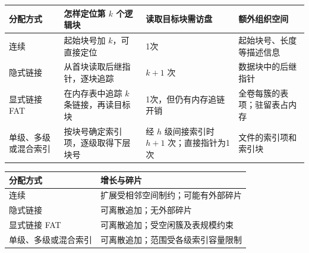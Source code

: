 \begin{wideblock}

\par\medskip\noindent\begin{minipage}{\linewidth}\fontsize{9.3}{12}\selectfont\begin{tabularx}{\linewidth}{@{}YYYY@{}}
\toprule\noalign{}
\begin{minipage}[b]{\linewidth}\raggedright
分配方式
\end{minipage} & \begin{minipage}[b]{\linewidth}\raggedright
怎样定位第 \(k\) 个逻辑块
\end{minipage} & \begin{minipage}[b]{\linewidth}\raggedright
读取目标块需访盘
\end{minipage} & \begin{minipage}[b]{\linewidth}\raggedright
额外组织空间
\end{minipage} \\
\midrule\noalign{}


连续 & 起始块号加 \(k\)，可直接定位 & 1次 & 起始块号、长度等描述信息 \\
隐式链接 & 从首块读取后继指针，逐块追踪 & \(k+1\) 次 & 数据块中的后继指针 \\
显式链接 FAT & 在内存表中追踪 \(k\) 条链接，再读目标块 & 1次，但仍有内存追链开销 & 全卷每簇的表项；驻留表占内存 \\
单级、多级或混合索引 & 按块号确定索引项，逐级取得下层块号 & 经 \(h\) 级间接索引时 \(h+1\) 次；直接指针为1次 & 文件的索引项和索引块 \\
\bottomrule\end{tabularx}
\end{minipage}\par\medskip

\end{wideblock}

\begin{wideblock}

\par\medskip\noindent\begin{minipage}{\linewidth}\fontsize{9.3}{12}\selectfont\begin{tabularx}{\linewidth}{@{}YY@{}}
\toprule\noalign{}
分配方式 & 增长与碎片 \\
\midrule\noalign{}


连续 & 扩展受相邻空间制约；可能有外部碎片 \\
隐式链接 & 可离散追加；无外部碎片 \\
显式链接 FAT & 可离散追加；受空闲簇及表规模约束 \\
单级、多级或混合索引 & 可离散追加；范围受各级索引容量限制 \\
\bottomrule\end{tabularx}
\end{minipage}\par\medskip

\end{wideblock}

